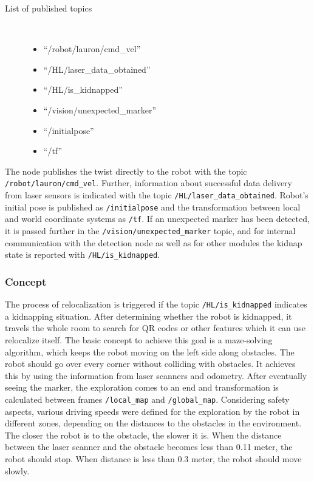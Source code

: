 \begin{description}	
\item[List of published topics]\
	\begin{itemize}
	\item ``/robot/lauron/cmd\_vel''
	\item ``/HL/laser\_data\_obtained''
	\item ``/HL/is\_kidnapped''
	\item ``/vision/unexpected\_marker''
	\item ``/initialpose''
	\item ``/tf''
	\end{itemize}
\end{description}

The node publishes the twist directly to the robot with the topic \texttt{/robot/lauron/cmd\_vel}. Further, information about successful data delivery from laser sensors is indicated with the topic \texttt{/HL/laser\_data\_obtained}. Robot's initial pose is published as \texttt{/initialpose} and the transformation between local and world coordinate systems as \texttt{/tf}. If an unexpected marker has been detected, it is passed further in the \texttt{/vision/unexpected\_marker} topic, and for internal communication with the detection node as well as for other modules the kidnap state is reported with \texttt{/HL/is\_kidnapped}.

\subsubsection{Concept}
The process of relocalization is triggered if the topic \texttt{/HL/is\_kidnapped} indicates a kidnapping situation. After determining whether the robot is kidnapped, it travels the whole room to search for QR codes or other features which it can use relocalize itself. The basic concept to achieve this goal is a maze-solving algorithm, which keeps the robot moving on the left side along obstacles. The robot should go over every corner without colliding with obstacles. It achieves this by using the information from laser scanners and odometry. After eventually seeing the marker, the exploration comes to an end and transformation is calculated between frames \texttt{/local\_map} and \texttt{/global\_map}. Considering safety aspects, various driving speeds were defined for the exploration by the robot in different zones, depending on the distances to the obstacles in the environment. The closer the robot is to the obstacle, the slower it is. When the distance between the laser scanner and the obstacle becomes less than 0.11 meter, the robot should stop. When distance is less than 0.3 meter, the robot should move slowly.


